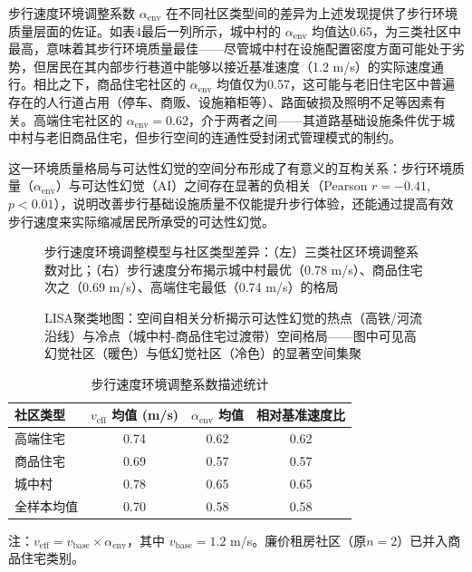 \documentclass[10pt,conference]{IEEEtran}
\begin{document}
步行速度环境调整系数 $\alpha_{\text{env}}$ 在不同社区类型间的差异为上述发现提供了步行环境质量层面的佐证。如表4最后一列所示，城中村的 $\alpha_{\text{env}}$ 均值达0.65，为三类社区中最高，意味着其步行环境质量最佳——尽管城中村在设施配置密度方面可能处于劣势，但居民在其内部步行巷道中能够以接近基准速度（1.2 m/s）的实际速度通行。相比之下，商品住宅社区的 $\alpha_{\text{env}}$ 均值仅为0.57，这可能与老旧住宅区中普遍存在的人行道占用（停车、商贩、设施箱柜等）、路面破损及照明不足等因素有关。高端住宅社区的 $\alpha_{\text{env}} = 0.62$，介于两者之间——其道路基础设施条件优于城中村与老旧商品住宅，但步行空间的连通性受封闭式管理模式的制约。

这一环境质量格局与可达性幻觉的空间分布形成了有意义的互构关系：步行环境质量（$\alpha_{\text{env}}$）与可达性幻觉（AI）之间存在显著的负相关（Pearson $r = -0.41$, $p < 0.01$），说明改善步行基础设施质量不仅能提升步行体验，还能通过提高有效步行速度来实际缩减居民所承受的可达性幻觉。

\begin{figure}[htbp]
\centering
\caption{步行速度环境调整模型与社区类型差异：（左）三类社区环境调整系数对比；（右）步行速度分布揭示城中村最优（0.78 m/s）、商品住宅次之（0.69 m/s）、高端住宅最低（0.74 m/s）的格局}
\label{fig:velocity_model}
\end{figure}

\begin{figure}[htbp]
\centering
\caption{LISA聚类地图：空间自相关分析揭示可达性幻觉的热点（高铁/河流沿线）与冷点（城中村-商品住宅过渡带）空间格局——图中可见高幻觉社区（暖色）与低幻觉社区（冷色）的显著空间集聚}
\label{fig:lisa}
\end{figure}

\begin{table}[htbp]
\caption{步行速度环境调整系数描述统计}
\label{tab:velocity_model}
\begin{center}
\begin{threeparttable}
\begin{tabular}{lccc}
\toprule
社区类型 & $v_{\text{eff}}$ 均值 (m/s) & $\alpha_{\text{env}}$ 均值 & 相对基准速度比 \\
\midrule
高端住宅 & 0.74 & 0.62 & 0.62 \\
商品住宅 & 0.69 & 0.57 & 0.57 \\
城中村 & 0.78 & 0.65 & 0.65 \\
\midrule
全样本均值 & 0.70 & 0.58 & 0.58 \\
\bottomrule
\end{tabular}
\begin{tablenotes}
\item 注：$v_{\text{eff}} = v_{\text{base}} \times \alpha_{\text{env}}$，其中 $v_{\text{base}} = 1.2$ m/s。廉价租房社区（原$n=2$）已并入商品住宅类别。
\end{tablenotes}
\end{threeparttable}
\end{center}
\end{table}
\end{document}
